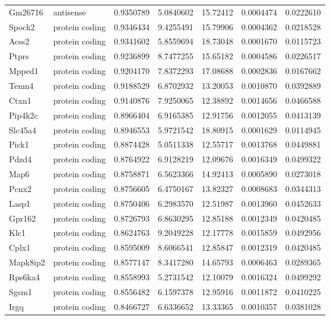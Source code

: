 \documentclass[onehalf,12pt]{beavtex}
\begin{document}
\begin{longtable}{llrrrrr}
  Gm26716 & antisense & 0.9350789 & 5.0840602 & 15.72412 & 0.0004474 & 0.0222610\\
  Spock2 & protein coding & 0.9346434 & 9.4255491 & 15.79906 & 0.0004362 & 0.0218528\\
  Acss2 & protein coding & 0.9341602 & 5.8559694 & 18.73048 & 0.0001670 & 0.0115723\\
  Ptprs & protein coding & 0.9236899 & 8.7477255 & 15.65182 & 0.0004586 & 0.0226517\\
  \addlinespace
  Mpped1 & protein coding & 0.9204170 & 7.8372293 & 17.08688 & 0.0002836 & 0.0167662\\
  Tenm4 & protein coding & 0.9188529 & 6.8702932 & 13.20053 & 0.0010870 & 0.0392889\\
  Ctxn1 & protein coding & 0.9140876 & 7.9250065 & 12.38892 & 0.0014656 & 0.0466588\\
  Pip4k2c & protein coding & 0.8966404 & 6.9165385 & 12.91756 & 0.0012055 & 0.0413139\\
  Slc45a4 & protein coding & 0.8946553 & 5.9721542 & 18.80915 & 0.0001629 & 0.0114945\\
  \addlinespace
  Pick1 & protein coding & 0.8874428 & 5.0511338 & 12.55717 & 0.0013768 & 0.0449881\\
  Pdzd4 & protein coding & 0.8764922 & 6.9128219 & 12.09676 & 0.0016349 & 0.0499322\\
  Map6 & protein coding & 0.8758871 & 6.5623366 & 14.92413 & 0.0005890 & 0.0273018\\
  Pcnx2 & protein coding & 0.8756605 & 6.4750167 & 13.82327 & 0.0008683 & 0.0344313\\
  Lasp1 & protein coding & 0.8750406 & 6.2983570 & 12.51987 & 0.0013960 & 0.0452633\\
  \addlinespace
  Gpr162 & protein coding & 0.8726793 & 6.8630295 & 12.85188 & 0.0012349 & 0.0420485\\
  Klc1 & protein coding & 0.8624763 & 9.2049228 & 12.17778 & 0.0015859 & 0.0492956\\
  Cplx1 & protein coding & 0.8595009 & 8.6066541 & 12.85847 & 0.0012319 & 0.0420485\\
  Mapk8ip2 & protein coding & 0.8577147 & 8.3417280 & 14.65793 & 0.0006463 & 0.0289365\\
  Rps6ka4 & protein coding & 0.8558993 & 5.2731542 & 12.10079 & 0.0016324 & 0.0499292\\
  \addlinespace
  Sgsm1 & protein coding & 0.8556482 & 6.1597378 & 12.95916 & 0.0011872 & 0.0410225\\
  Irgq & protein coding & 0.8466727 & 6.6336652 & 13.33365 & 0.0010357 & 0.0381028\\

\end{longtable}
\end{document}
